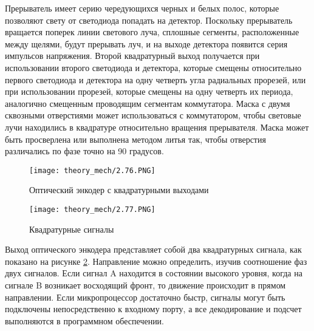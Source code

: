 \documentclass[11pt, a4paper]{article}
\begin{document}
Прерыватель имеет серию чередующихся черных и белых полос, которые позволяют свету от светодиода попадать на детектор. Поскольку прерыватель вращается поперек линии светового луча, сплошные сегменты, расположенные между щелями, будут прерывать луч, и на выходе детектора появится серия импульсов напряжения. Второй квадратурный выход получается при использовании второго светодиода и детектора, которые смещены относительно первого светодиода и детектора на одну четверть угла радиальных прорезей, или при использовании прорезей, которые смещены на одну четверть их периода, аналогично смещенным проводящим сегментам коммутатора. Маска с двумя сквозными отверстиями может использоваться с коммутатором, чтобы световые лучи находились в квадратуре относительно вращения прерывателя. Маска может быть просверлена или выполнена методом литья так, чтобы отверстия различались по фазе точно на 90 градусов.

\begin{figure}[h]
    \centering
    \texttt{[image: theory\_mech/2.76.PNG]}
    \caption{Оптический энкодер с квадратурными выходами}
    \label{fig:theoryQuadEncoder}
\end{figure}

\begin{figure}[h]
    \centering
    \texttt{[image: theory\_mech/2.77.PNG]}
    \caption{Квадратурные сигналы}
    \label{fig:theoryQuadDiag}
\end{figure}

Выход оптического энкодера представляет собой два квадратурных сигнала, как показано на рисунке \ref{fig:theoryQuadDiag}. Направление можно определить, изучив соотношение фаз двух сигналов. Если сигнал A находится в состоянии высокого уровня, когда на сигнале B возникает восходящий фронт, то движение происходит в прямом направлении. Если микропроцессор достаточно быстр, сигналы могут быть подключены непосредственно к входному порту, а все декодирование и подсчет выполняются в программном обеспечении.
\end{document}
